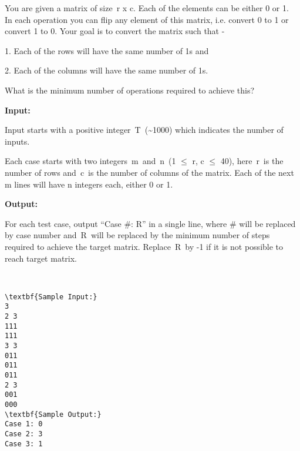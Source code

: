 

You are given a matrix of size r x c. Each of the elements can be either 0 or 1.  In each operation you can flip any element of this matrix, i.e. convert 0 to 1 or convert 1 to 0. Your goal is to convert the matrix such that -

1. Each of the rows will have the same number of 1s and

2. Each of the columns will have the same number of 1s.

What is the minimum number of operations required to achieve this?

\textbf{Input:}

Input starts with a positive integer T (\textasciitilde1000) which indicates the number of inputs.

Each case starts with two integers m and n (1  $\le$  r, c  $\le$  40), here r is the number of rows and c is the number of columns of the matrix. Each of the next m lines will have n integers each, either 0 or 1.

\textbf{Output:}

For each test case, output “Case \#: R” in a single line, where \# will be replaced by case number and R will be replaced by the minimum number of steps required to achieve the target matrix. Replace R by -1 if it is not possible to reach target matrix.

 
\begin{verbatim}
\textbf{Sample Input:}
3
2 3
111
111
3 3
011
011
011
2 3
001
000
\textbf{Sample Output:}
Case 1: 0
Case 2: 3
Case 3: 1
\end{verbatim}
